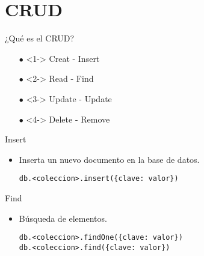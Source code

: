 \documentclass[12pt]{beamer}
\begin{document}
\section{CRUD}
\begin{frame}{¿Qué es el CRUD?}
  
  \begin{itemize}
  \item[$\bullet$]<1->  Creat - Insert

  \item[$\bullet$]<2->  Read - Find

  \item[$\bullet$]<3->  Update - Update

  \item[$\bullet$]<4->  Delete - Remove 
  \end{itemize}
\end{frame}

\begin{frame}[fragile]{Insert}
  
  \begin{itemize}
  \item Inserta un nuevo documento en la base de datos.

    \begin{verbatim}
db.<coleccion>.insert({clave: valor})
    \end{verbatim}
    
  \end{itemize}
\end{frame}


\begin{frame}[fragile]{Find}

  \begin{itemize}
  \item Búsqueda de elementos.

    \begin{verbatim}
db.<coleccion>.findOne({clave: valor})
db.<coleccion>.find({clave: valor})
    \end{verbatim}
  \end{itemize}
\end{frame}

\renewcommand{\PYZdl}{\textdollar}
\end{document}
